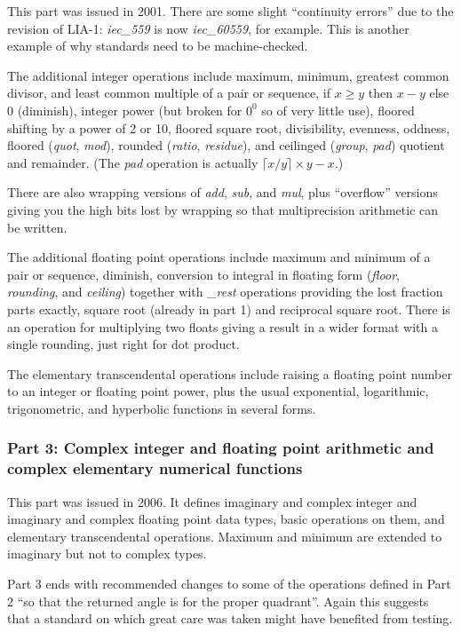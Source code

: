 \documentclass{article}
\begin{document}
This part was issued in 2001.  There are some slight ``continuity
errors'' due to the revision of LIA-1: {\it iec\_559}\subF{} is
now {\it iec\_60559}\subF{}, for example.  This is another example
of why standards need to be machine-checked.

The additional integer operations include maximum, minimum,
greatest common divisor, and least common multiple
of a pair or sequence, if $x\ge y$ then $x-y$ else 0 (diminish),
integer power (but broken for $0^0$ so of very little use),
floored shifting by a power of 2 or 10, floored square root,
divisibility, evenness, oddness, floored ({\it quot}\subI{},
{\it mod}\subI{}), rounded ({\it ratio}\subI{}, {\it residue}\subI{}),
and ceilinged ({\it group}\subI{}, {\it pad}) quotient and remainder.
(The {\it pad} operation is actually $\lceil x/y \rceil\times y - x$.)

There are also wrapping versions of {\it add}, {\it sub}, and
{\it mul}, plus ``overflow'' versions giving you the high bits
lost by wrapping so that multiprecision arithmetic can be written.

The additional floating point operations include maximum and
minimum of a pair or sequence, diminish,  conversion to integral
in floating form ({\it floor}\subF{}, {\it rounding}\subF{}, and
{\it ceiling}\subF{}) together with {\it *\_rest}\subF{} operations
providing the lost fraction parts exactly, square root (already
in part 1) and reciprocal square root.  There is an operation
for multiplying two floats giving a result in a wider format with
a single rounding, just right for dot product.

The elementary transcendental operations include raising a
floating point number to an integer or floating point power,
plus the usual exponential, logarithmic, trigonometric, and
hyperbolic functions in several forms.

\subsubsection{Part 3: Complex integer and floating point
arithmetic and complex elementary numerical functions}

This part was issued in 2006.  It defines imaginary and
complex integer and imaginary and complex floating point
data types, basic operations on them, and elementary
transcendental operations.  Maximum and minimum are extended
to imaginary but not to complex types.

Part 3 ends with recommended changes to some of the operations
defined in Part 2 ``so that the returned angle is for the
proper quadrant''.  Again this suggests that a standard on which
great care was taken might have benefited from testing.
\end{document}
